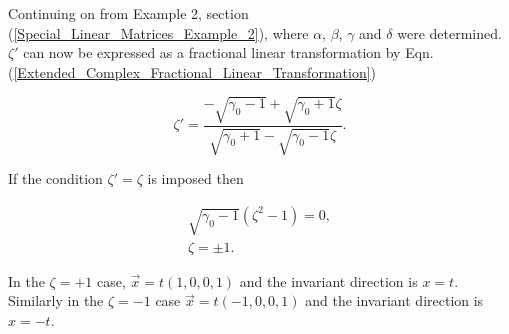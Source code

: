 Continuing on from Example 2, section (\ref{Special_Linear_Matrices_Example_2}), where $\alpha$, $\beta$, $\gamma$ and $\delta$ were determined. $\zeta'$ can now be expressed as a fractional linear transformation by Eqn.(\ref{Extended_Complex_Fractional_Linear_Transformation})

\begin{equation*} 
\zeta' = \frac{-\sqrt{\gamma_0 - 1} + \sqrt{\gamma_0 + 1}\zeta}{\sqrt{\gamma_0 + 1} - \sqrt{\gamma_0 - 1}\zeta}.
\end{equation*}

\noindent If the condition $\zeta' = \zeta$ is imposed then

\begin{gather*}
\sqrt{\gamma_0 - 1}(\zeta^2 - 1) = 0, \\
\zeta = \pm 1.
\end{gather*}

In the $\zeta = +1$ case, $\vec{x} = t(1,0,0,1)$ and the invariant direction is $x=t$. Similarly in the $\zeta = -1$ case $\vec{x} = t(-1,0,0,1)$ and the invariant direction is $x = - t$. 



   












